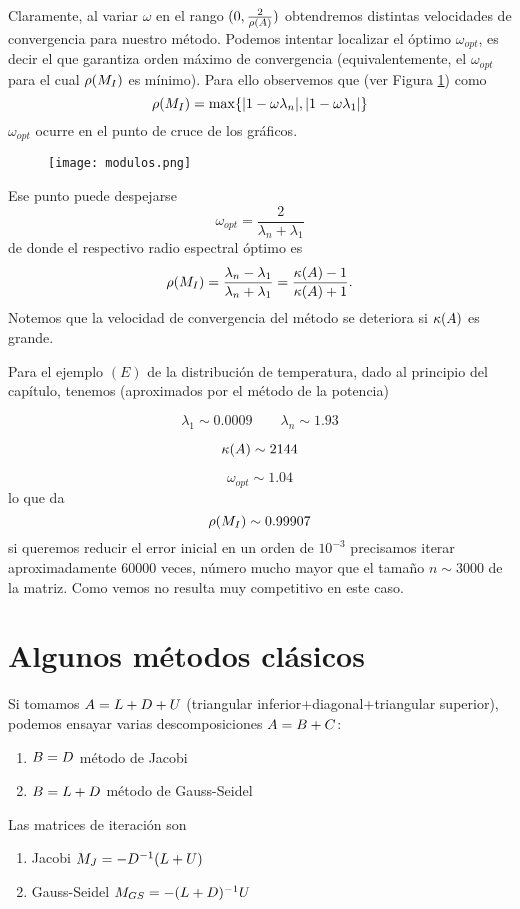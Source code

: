 Claramente, al variar $\omega$ en el rango $(0,\frac{2}{\rho(\Ab)})$ obtendremos distintas velocidades de convergencia para nuestro método. Podemos intentar localizar el óptimo $\omega_{opt}$, es decir el que garantiza orden máximo de convergencia (equivalentemente, el $\omega_{opt}$ para el cual $\rho(\Mb_I)$ es mínimo). Para ello observemos que   (ver Figura \ref{fig:modulos}) como
$$
\rho(\Mb_I)=\max\{
|1-\omega   \lambda_n|,|1-\omega   \lambda_1|\}
$$
$\omega_{opt}$ ocurre en el punto de cruce de los gráficos.
\begin{figure}[h]
\label{fig:modulos}
\centering\texttt{[image: modulos.png]}
\end{figure}
Ese punto puede despejarse
$$
\omega_{opt}=\frac{2}{\lambda_n+\lambda_1}
$$
de donde el respectivo radio espectral óptimo es
$$\rho(\Mb_I)=\frac{\lambda_n-\lambda_1}{\lambda_n+\lambda_1}=\frac{\kappa(\Ab)-1}{\kappa(\Ab)+1}.
$$
Notemos que la velocidad de convergencia del método se deteriora si  $\kappa(\Ab)$ es grande.

\tcc
Para el ejemplo $(E)$ de la distribución de temperatura, dado al principio del capítulo, tenemos (aproximados por el método de la potencia)

$$
\lambda_1\sim 0.0009 \qquad \lambda_n \sim 1.93
$$

$$\kappa(\Ab)\sim 2144$$

$$\omega_{opt}\sim
1.04$$
lo que da
$$\rho(\Mb_I)\sim 0.99907$$
si queremos reducir  el error inicial en un orden  de $10^{-3}$ precisamos iterar aproximadamente $60000$ veces, número mucho mayor que el tamaño  $n\sim 3000$ de la matriz. Como vemos no resulta muy competitivo en este caso.
\etcc


\section{Algunos métodos clásicos}



Si tomamos $\Ab=\Lb+\Db+\Ub$ (triangular inferior+diagonal+triangular superior), podemos ensayar varias descomposiciones $\Ab=\Bb+\Cb$:
\begin{enumerate}
 \item $\Bb=\Db$ método de Jacobi
 \item $\Bb=\Lb+\Db$ método de Gauss-Seidel
\end{enumerate}

Las matrices de iteración son
\begin{enumerate}
 \item Jacobi $\Mb_J=-\Db^{-1}(\Lb+\Ub)$
 \item Gauss-Seidel $\Mb_{GS}=-(\Lb+\Db)^{-1}\Ub$
\end{enumerate}

